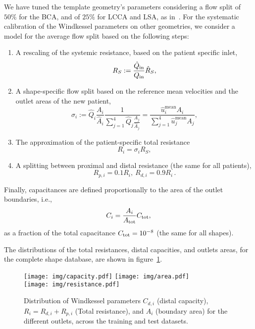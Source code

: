 We have tuned the template geometry's parameters considering a flow split of $50\%$ for the BCA, and of $25\%$ for LCCA and LSA, as in~\cite{katz2023impact}. For the systematic calibration of the Windkessel parameters on other geometries, we consider a model for the average flow split based on the following steps:
\begin{enumerate}[itemsep=2pt, left=0pt, labelsep=5pt]
  \item A rescaling of the systemic resistance, based on the patient specific inlet,
  \begin{equation*}%
  R_S :=  \frac{\hat Q_{\rm in}}{Q_{\rm in}} \hat R_S,
  \end{equation*}
  \item A shape-specific flow split based on the reference mean velocities and the outlet areas of the new patient,
  \begin{equation*}%
      \sigma_i := \hat Q_i \frac{A_i}{\hat A_i} \frac{1}{\sum_{j=1}^4 \hat Q_j \frac{A_j}{\hat A_j}} = \frac{\hat u^{\mathrm{mean}}_i A_i }{ \sum_{j=1}^4 \hat u^{\mathrm{mean}}_j A_j},
  \end{equation*}
      \item The approximation of the patient-specific total resistance 
      \begin{equation*}
        R_i = \sigma_i R_S,
      \end{equation*}
      \item A splitting between proximal and distal resistance (the same for all  patients),
  \begin{equation*}%
  R_{p,i}  = 0.1 R_i,\ R_{d,i}=0.9 R_i\,.
  \end{equation*}    
\end{enumerate}
 Finally, capacitances are defined proportionally to the area of the outlet boundaries, i.e., 
\begin{equation*}
  C_i = \frac{A_i}{A_{\rm tot}} C_{\rm tot},
\end{equation*}
as a fraction of the total capacitance $C_{\rm tot} = 10^{-8}$ (the same for all shapes).

The distributions of the total resistances, distal capacities, and outlets areas, for the complete shape database, are shown in figure~\ref{fig:param_distr}.
\begin{figure}[!htp]
  \centering
  \texttt{[image: img/capacity.pdf]}
  \texttt{[image: img/area.pdf]}\\
  \texttt{[image: img/resistance.pdf]}
  \caption{Distribution of Windkessel parameters $C_{d,i}$ (distal capacity), $R_i=R_{d,i}+R_{p,i}$ (Total resistance), and $A_i$ (boundary area) for the different outlets, across the training and test datasets.}
  \label{fig:param_distr}
\end{figure}


